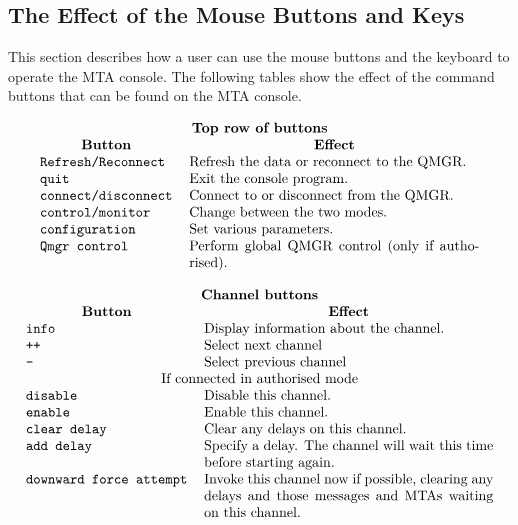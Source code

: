 \subsection	{The Effect of the Mouse Buttons and Keys}

This section describes how a user can use the mouse buttons and the
keyboard to operate the MTA console. The following tables show the
effect of the command buttons that can be found on the
MTA console.

\[\begin{tabular}{l p{0.6\textwidth}}
	\multicolumn{2}{c}{\bf Top row of buttons} \\
	\multicolumn{1}{c}{\bf Button}&
		\multicolumn{1}{c}{\bf Effect}\\	
	\tt Refresh/Reconnect & Refresh the data or reconnect to the
				QMGR. \\
	\tt quit & Exit the console program. \\
	\tt connect/disconnect & Connect to or disconnect from the QMGR. \\
	\tt control/monitor & Change between the two modes. \\
	\tt configuration & Set various parameters. \\
	\tt Qmgr control & Perform global QMGR control (only if authorised). \\
\end{tabular}\]

\[\begin{tabular}{l p{0.6\textwidth}}
	\multicolumn{2}{c}{\bf Channel buttons} \\
	\multicolumn{1}{c}{\bf Button}&
		\multicolumn{1}{c}{\bf Effect}\\	
	\tt info & Display information about the channel. \\
	\tt ++ & Select next channel \\
	\tt -- & Select previous channel \\
	\multicolumn{2}{c}{If connected in authorised mode} \\
	\tt disable & Disable this channel. \\
	\tt enable & Enable this channel. \\
	\tt clear delay & Clear any delays on this channel. \\
	\tt add delay & Specify a delay. The channel will wait this
			time before starting again. \\
	\tt downward force attempt & Invoke this channel now if
			possible, clearing any delays and those
			messages and MTAs waiting on this channel. \\
\end{tabular}\]

